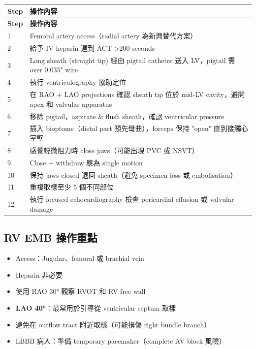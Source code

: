 \documentclass[12pt,a4paper]{article}
\begin{document}
\begin{longtable}{p{1cm}p{13cm}}
\toprule
\textbf{Step} & \textbf{操作內容} \\
\midrule
\endfirsthead

\toprule
\textbf{Step} & \textbf{操作內容} \\
\midrule
\endhead

\bottomrule
\endfoot

1 & Femoral artery access（radial artery 為新興替代方案）\\
\midrule
2 & 給予 IV heparin 達到 ACT >200 seconds \\
\midrule
3 & Long sheath (straight tip) 經由 pigtail catheter 送入 LV，pigtail 需 over 0.035" wire \\
\midrule
4 & 執行 ventriculography 協助定位 \\
\midrule
5 & 在 RAO + LAO projections 確認 sheath tip 位於 mid-LV cavity，避開 apex 和 valvular apparatus \\
\midrule
6 & 移除 pigtail，aspirate \& flush sheath，確認 ventricular pressure \\
\midrule
7 & 插入 bioptome（distal part 預先彎曲），forceps 保持 "open" 直到接觸心室壁 \\
\midrule
8 & 感覺輕微阻力時 close jaws（可能出現 PVC 或 NSVT）\\
\midrule
9 & Close + withdraw 應為 single motion \\
\midrule
10 & 保持 jaws closed 退回 sheath（避免 specimen loss 或 embolisation）\\
\midrule
11 & 重複取樣至少 5 個不同部位 \\
\midrule
12 & 執行 focused echocardiography 檢查 pericardial effusion 或 valvular damage \\
\bottomrule
\end{longtable}

\subsection{RV EMB 操作重點}

\begin{itemize}
    \item Access：Jugular、femoral 或 brachial vein
    \item Heparin 非必要
    \item 使用 RAO 30° 觀察 RVOT 和 RV free wall
    \item \textbf{LAO 40°}：最常用於引導從 ventricular septum 取樣
    \item 避免在 outflow tract 附近取樣（可能損傷 right bundle branch）
    \item LBBB 病人：準備 temporary pacemaker（complete AV block 風險）
\end{itemize}
\end{document}
